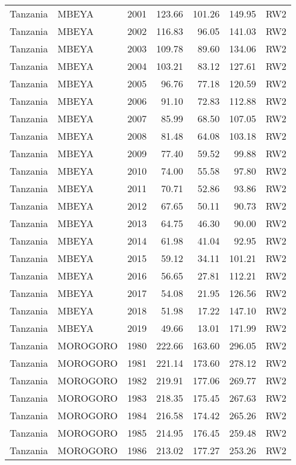 \begin{longtable}{lllrrrl}
  Tanzania & MBEYA & 2001 & 123.66 & 101.26 & 149.95 & RW2 \\ 
  Tanzania & MBEYA & 2002 & 116.83 & 96.05 & 141.03 & RW2 \\ 
  Tanzania & MBEYA & 2003 & 109.78 & 89.60 & 134.06 & RW2 \\ 
  Tanzania & MBEYA & 2004 & 103.21 & 83.12 & 127.61 & RW2 \\ 
  Tanzania & MBEYA & 2005 & 96.76 & 77.18 & 120.59 & RW2 \\ 
  Tanzania & MBEYA & 2006 & 91.10 & 72.83 & 112.88 & RW2 \\ 
  Tanzania & MBEYA & 2007 & 85.99 & 68.50 & 107.05 & RW2 \\ 
  Tanzania & MBEYA & 2008 & 81.48 & 64.08 & 103.18 & RW2 \\ 
  Tanzania & MBEYA & 2009 & 77.40 & 59.52 & 99.88 & RW2 \\ 
  Tanzania & MBEYA & 2010 & 74.00 & 55.58 & 97.80 & RW2 \\ 
  Tanzania & MBEYA & 2011 & 70.71 & 52.86 & 93.86 & RW2 \\ 
  Tanzania & MBEYA & 2012 & 67.65 & 50.11 & 90.73 & RW2 \\ 
  Tanzania & MBEYA & 2013 & 64.75 & 46.30 & 90.00 & RW2 \\ 
  Tanzania & MBEYA & 2014 & 61.98 & 41.04 & 92.95 & RW2 \\ 
  Tanzania & MBEYA & 2015 & 59.12 & 34.11 & 101.21 & RW2 \\ 
  Tanzania & MBEYA & 2016 & 56.65 & 27.81 & 112.21 & RW2 \\ 
  Tanzania & MBEYA & 2017 & 54.08 & 21.95 & 126.56 & RW2 \\ 
  Tanzania & MBEYA & 2018 & 51.98 & 17.22 & 147.10 & RW2 \\ 
  Tanzania & MBEYA & 2019 & 49.66 & 13.01 & 171.99 & RW2 \\ 
  Tanzania & MOROGORO & 1980 & 222.66 & 163.60 & 296.05 & RW2 \\ 
  Tanzania & MOROGORO & 1981 & 221.14 & 173.60 & 278.12 & RW2 \\ 
  Tanzania & MOROGORO & 1982 & 219.91 & 177.06 & 269.77 & RW2 \\ 
  Tanzania & MOROGORO & 1983 & 218.35 & 175.45 & 267.63 & RW2 \\ 
  Tanzania & MOROGORO & 1984 & 216.58 & 174.42 & 265.26 & RW2 \\ 
  Tanzania & MOROGORO & 1985 & 214.95 & 176.45 & 259.48 & RW2 \\ 
  Tanzania & MOROGORO & 1986 & 213.02 & 177.27 & 253.26 & RW2 \\ 

\end{longtable}

